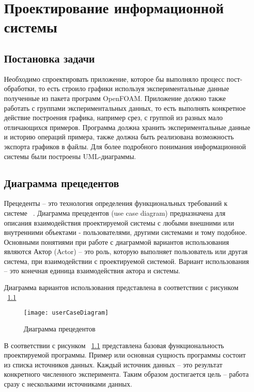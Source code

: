 \documentclass[14pt]{extreport}
\begin{document}
\chapter{Проектирование информационной системы}
\section{Постановка задачи}
Необходимо спроектировать приложение, которое бы выполняло процесс пост-обработки, то есть строило графики используя экспериментальные данные полученные из пакета программ OpenFOAM. Приложение должно также работать с группами экспериментальных данных, то есть выполнять конкретное действие построения графика, например срез, с группой из разных мало отличающихся примеров. Программа должна хранить экспериментальные данные и историю операций примера, также должна быть реализована возможность экспорта графиков в файлы.
Для более подробного понимания информационной системы были построены UML-диаграммы. 

\section{Диаграмма прецедентов}
Прецеденты -- это технология определения функциональных требований к системе ~\cite{umlDistilled}. 
Диаграмма прецедентов (use case diagram) предназначена для описания взаимодействия проектируемой системы с любыми внешними или внутренними объектами - пользователями, другими системами и тому подобное.
Основными понятиями при работе с диаграммой вариантов использования являются 
Актор (Actor) -- это роль, которую выполняет пользователь или другая система, при взаимодействии с проектируемой системой.
Вариант использования -- это конечная единица взаимодействия актора и системы. 

Диаграмма вариантов использования представлена в соответствии с рисунком ~\ref{fig5}
\begin{figure}[H]
\centerline{\texttt{[image: userCaseDiagram]}}
\caption{Диаграмма прецедентов}
\label{fig5}
\end{figure}

В соответствии с рисунком ~\ref{fig5} представлена базовая функциональность проектируемой программы. Пример или основная сущность программы состоит из списка источников данных. Каждый источник данных -- это результат конкретного численного эксперимента. Таким образом достигается цель -- работа сразу с несколькими источниками данных.   
\end{document}
